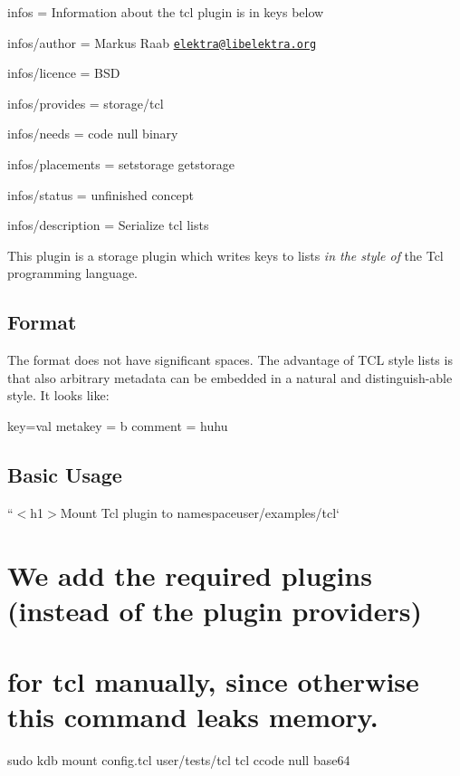 
\begin{DoxyItemize}
\item infos = Information about the tcl plugin is in keys below
\item infos/author = Markus Raab \href{mailto:elektra@libelektra.org}{\tt elektra@libelektra.\+org}
\item infos/licence = B\+SD
\item infos/provides = storage/tcl
\item infos/needs = code null binary
\item infos/placements = setstorage getstorage
\item infos/status = unfinished concept
\item infos/description = Serialize tcl lists
\end{DoxyItemize}

This plugin is a storage plugin which writes keys to lists {\itshape in the style of} the Tcl programming language.

\subsection*{Format}

The format does not have significant spaces. The advantage of T\+CL style lists is that also arbitrary metadata can be embedded in a natural and distinguish-\/able style. It looks like\+: \begin{DoxyVerb}{
    {
        key=val
        {
            metakey = b
        }
        {
            comment = huhu
        }
    }
}
\end{DoxyVerb}


\subsection*{Basic Usage}

``{\ttfamily  $<$h1$>$Mount Tcl plugin to namespace}user/examples/tcl` \section*{We add the required plugins (instead of the plugin providers)}

\section*{for {\ttfamily tcl} manually, since otherwise this command leaks memory.}

sudo kdb mount config.\+tcl user/tests/tcl tcl ccode null base64

